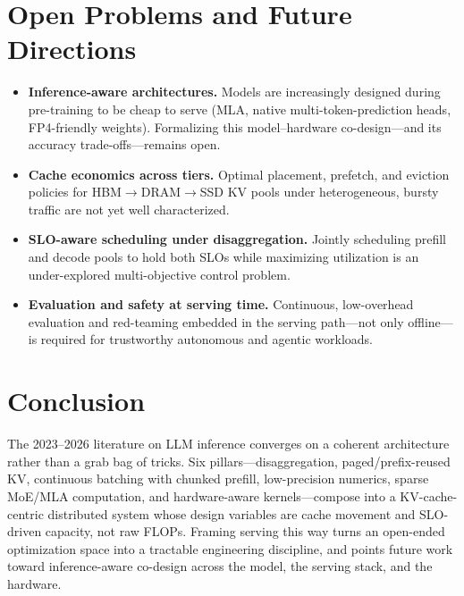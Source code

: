 \documentclass[11pt]{article}
\begin{document}
\section{Open Problems and Future Directions}
\begin{itemize}[leftmargin=1.4em,itemsep=2pt]
\item \textbf{Inference-aware architectures.} Models are increasingly designed during pre-training to be cheap
to serve (MLA, native multi-token-prediction heads, FP4-friendly weights). Formalizing this model--hardware
co-design---and its accuracy trade-offs---remains open.
\item \textbf{Cache economics across tiers.} Optimal placement, prefetch, and eviction policies for
HBM$\to$DRAM$\to$SSD KV pools under heterogeneous, bursty traffic are not yet well characterized.
\item \textbf{SLO-aware scheduling under disaggregation.} Jointly scheduling prefill and decode pools to hold
both SLOs while maximizing utilization is an under-explored multi-objective control problem.
\item \textbf{Evaluation and safety at serving time.} Continuous, low-overhead evaluation and red-teaming
embedded in the serving path---not only offline---is required for trustworthy autonomous and agentic workloads.
\end{itemize}

\section{Conclusion}
The 2023--2026 literature on LLM inference converges on a coherent architecture rather than a grab bag of
tricks. Six pillars---disaggregation, paged/prefix-reused KV, continuous batching with chunked prefill,
low-precision numerics, sparse MoE/MLA computation, and hardware-aware kernels---compose into a
KV-cache-centric distributed system whose design variables are cache movement and SLO-driven capacity, not raw
FLOPs. Framing serving this way turns an open-ended optimization space into a tractable engineering discipline,
and points future work toward inference-aware co-design across the model, the serving stack, and the hardware.
\end{document}
